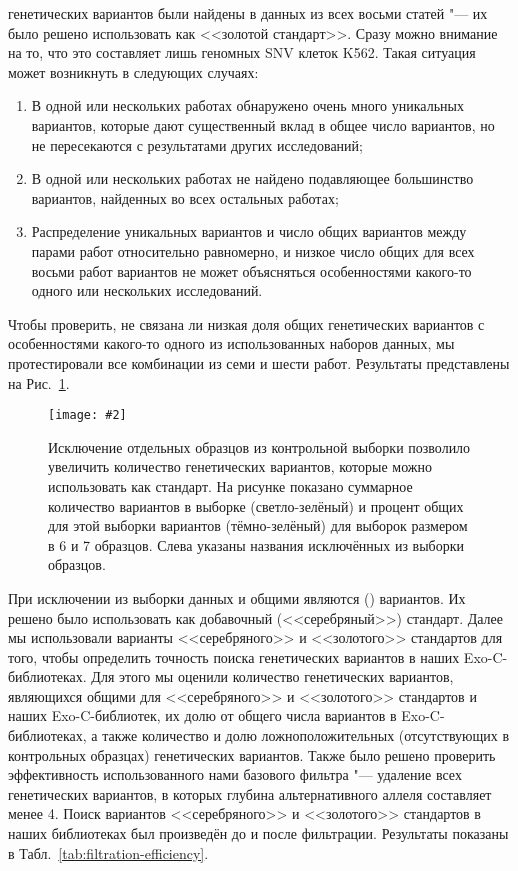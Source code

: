 \documentclass[a4paper,14pt]{extarticle}
\newcommand{\centerfigure}[5]
{\begin{figure}[#1]\centering\texttt{[image: \#2]}\caption{\label{#3}#4}\end{figure}}
\newcommand{\picref}[1]{Рис.~\ref{#1}}
\newcommand{\tableref}[1]{Табл.~\ref{#1}}
\begin{document}
 генетических вариантов были найдены в данных из всех восьми статей "--- их было решено использовать как <<золотой стандарт>>.
Сразу можно внимание на то, что это составляет лишь  геномных SNV клеток K562.
Такая ситуация может возникнуть в следующих случаях:

\begin{enumerate}
	\item В одной или нескольких работах обнаружено очень много уникальных вариантов, которые дают существенный вклад в общее число вариантов, но не пересекаются с результатами других исследований;
	\item В одной или нескольких работах не найдено подавляющее большинство вариантов, найденных во всех остальных работах;
	\item Распределение уникальных вариантов и число общих вариантов между парами работ относительно равномерно, и низкое число общих для всех восьми работ вариантов не может объясняться особенностями какого-то одного или нескольких исследований.
\end{enumerate}

Чтобы проверить, не связана ли низкая доля общих генетических вариантов с особенностями какого-то одного из использованных наборов данных, мы протестировали все комбинации из семи и шести работ.
Результаты представлены на \picref{fig:exclusion}.

\centerfigure{hp!}{Exclusion_6.pdf}{fig:exclusion}{Исключение отдельных образцов из контрольной выборки позволило увеличить количество генетических вариантов, которые можно использовать как стандарт. На рисунке показано суммарное количество вариантов в выборке (светло-зелёный) и процент общих для этой выборки вариантов (тёмно-зелёный) для выборок размером в 6 и 7 образцов. Слева указаны названия исключённых из выборки образцов.}{0.7}

При исключении из выборки данных \citeauthor{Banaszak_2018} и \citeauthor{Belaghzal_2017} общими являются  () вариантов.
Их решено было использовать как добавочный (<<серебряный>>) стандарт.
Далее мы использовали варианты <<серебряного>> и <<золотого>> стандартов для того, чтобы определить точность поиска генетических вариантов в наших Exo-C\hyp{}библиотеках.
Для этого мы оценили количество генетических вариантов, являющихся общими для <<серебряного>> и <<золотого>> стандартов и наших Exo-C\hyp{}библиотек, их долю от общего числа вариантов в Exo-C\hyp{}библиотеках, а также количество и долю ложноположительных (отсутствующих в контрольных образцах) генетических вариантов.
Также было решено проверить эффективность использованного нами базового фильтра "--- удаление всех генетических вариантов, в которых глубина альтернативного аллеля составляет менее 4.
Поиск вариантов <<серебряного>> и <<золотого>> стандартов в наших библиотеках был произведён до и после фильтрации.
Результаты показаны в \tableref{tab:filtration-efficiency}.
\end{document}
